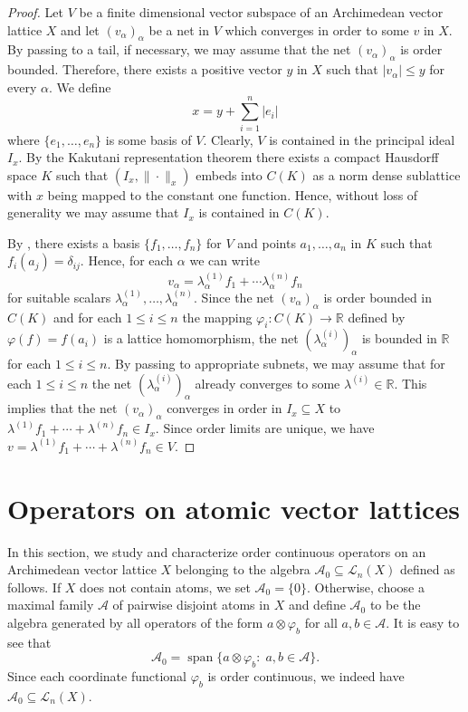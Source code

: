 \documentclass[12pt,reqno]{amsart}
\theoremstyle{plain}
\theoremstyle{definition}
\DeclareMathOperator{\Span}{span}
\begin{document}
\begin{proof}
Let $V$ be a finite dimensional vector subspace of an Archimedean vector lattice $X$ and let $(v_\alpha)_\alpha$
be a net in $V$ which converges in order to some $v$ in $X$. By passing to a tail, if necessary, we may assume that the net $(v_\alpha)_{\alpha}$ is order bounded. Therefore, 
there exists a positive vector $y$ in $X$ such that $|v_\alpha|\leq y$ for every $\alpha$. 
We define 
$$x=y+\sum_{i=1}^n |e_i|$$
where $\{e_1, \ldots, e_n\}$ is some basis of $V$. 
Clearly, $V$ is contained in the principal ideal $I_x$.  
By the Kakutani representation theorem there exists a compact Hausdorff space $K$ such that $(I_x, \|\cdot\|_x)$ embeds into $C(K)$ as a norm dense sublattice with $x$ being mapped to the constant one function. 
Hence, without loss of generality we may assume that $I_x$ is contained in $C(K)$. 

By , there exists a basis $\{f_1,\ldots,f_n\}$ for $V$ and points $a_1,\ldots, a_n$ in $K$ such that $f_i(a_j)=\delta_{ij}$. Hence, for each $\alpha$ we can write 
$$v_\alpha = \lambda_\alpha^{(1)} f_1+\cdots \lambda_\alpha^{(n)}f_n$$
for suitable scalars $\lambda_\alpha^{(1)}, \ldots, \lambda_\alpha^{(n)}$. 
Since the net $(v_\alpha)_\alpha$ is order bounded in $C(K)$ and for each $1\leq i\leq n$ the mapping $\varphi_i\colon C(K)\to \mathbb R$ defined by $\varphi(f)=f(a_i)$ is a lattice homomorphism, the net $(\lambda_\alpha^{(i)})_\alpha$ is bounded in $\mathbb R$ for each $1\leq i\leq n$. By passing to appropriate subnets, we may assume that for each $1\leq i\leq n$ the net $(\lambda_\alpha^{(i)})_\alpha$ already converges to some $\lambda^{(i)}\in \mathbb R$. This implies that the net $(v_\alpha)_\alpha$ converges in order in $I_x\subseteq X$ to $\lambda^{(1)} f_1+\cdots+\lambda^{(n)} f_n \in I_x$.
Since order limits are unique, we have $v=\lambda^{(1)} f_1+\cdots+\lambda^{(n)} f_n\in V$.
\end{proof}
 
\section{Operators on atomic vector lattices}\label{operators_atomic_VL}

In this section, we study and characterize order continuous operators on an Archi\-me\-de\-an vector lattice $X$ belonging to the algebra $\mathscr A_0 \subseteq \mathscr L_n(X)$ defined as follows. If $X$ does not contain atoms, we set $\mathscr A_0=\{0\}$. Otherwise, choose a maximal family $\mathcal A$ of pairwise disjoint atoms in $X$ and define $\mathscr A_0$ to be the algebra generated by all operators of the form $a\otimes \varphi_b$ for all $a, b\in \mathcal A$. It is easy to see that
\begin{equation}\label{A_0 def}
    \mathscr A_0 = \Span\{a\otimes \varphi_b:\; a,b\in \mathcal A\}.
\end{equation} 
Since each coordinate functional $\varphi_b$ is order continuous, we indeed have $\mathscr A_0 \subseteq \mathscr L_n(X)$.  
\end{document}
